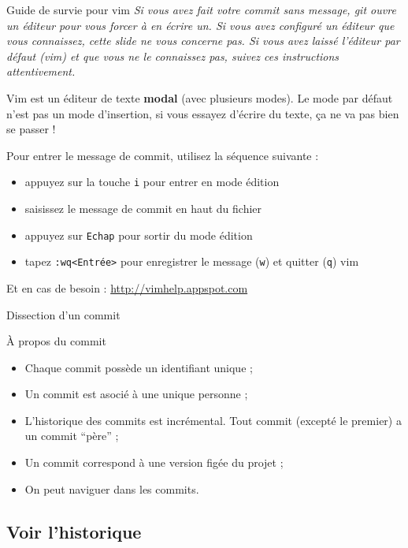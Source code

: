 \documentclass[usepdftitle=false]{beamer}
\begin{document}
\begin{frame}[fragile]{Guide de survie pour vim}
	\textit{Si vous avez fait votre commit sans message, git ouvre un éditeur pour vous forcer à en écrire un. Si vous avez configuré un éditeur que vous connaissez, cette slide ne vous concerne pas. Si vous avez laissé l'éditeur par défaut (vim) et que vous ne le connaissez pas, suivez ces instructions attentivement.} 

	Vim est un éditeur de texte \textbf{modal} (avec plusieurs modes). Le mode par défaut n'est pas un mode d'insertion, si vous essayez d'écrire du texte, ça ne va pas bien se passer ! 

	Pour entrer le message de commit, utilisez la séquence suivante :
	\begin{itemize}
		\item appuyez sur la touche \verb+i+ pour entrer en mode édition
		\item saisissez le message de commit en haut du fichier
		\item appuyez sur \verb+Echap+ pour sortir du mode édition
		\item tapez \verb+:wq<Entrée>+ pour enregistrer le message (\verb+w+) et quitter (\verb+q+) vim
	\end{itemize}

	Et en cas de besoin : \url{http://vimhelp.appspot.com}

\end{frame}

\begin{frame}{Dissection d'un commit}
	\begin{block}{À propos du commit}
		\begin{itemize}
			\item Chaque commit possède un identifiant unique ;
			\item Un commit est asocié à une unique personne ;
			\item L'historique des commits est incrémental. Tout commit (excepté le premier) a un commit \enquote{père} ;
			\item Un commit correspond à une version figée du projet ;
			\item On peut naviguer dans les commits.
		\end{itemize}
	\end{block}
\end{frame}

\subsection{Voir l'historique}
\end{document}
